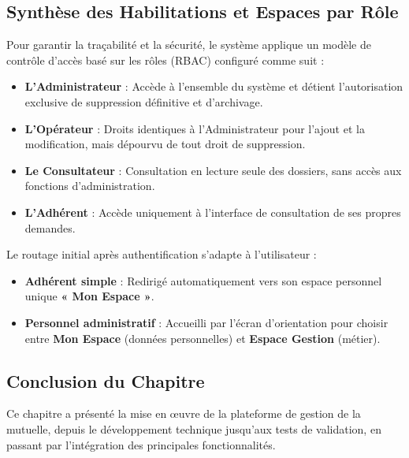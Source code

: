 \subsection{Synthèse des Habilitations et Espaces par Rôle}
\label{subsec:rbac_synthese}
Pour garantir la traçabilité et la sécurité, le système applique un modèle de contrôle d'accès basé sur les rôles (RBAC) configuré comme suit :
\begin{itemize}
    \item \textbf{L'Administrateur} : Accède à l'ensemble du système et détient l'autorisation exclusive de suppression définitive et d'archivage.
    \item \textbf{L'Opérateur} : Droits identiques à l'Administrateur pour l'ajout et la modification, mais dépourvu de tout droit de suppression.
    \item \textbf{Le Consultateur} : Consultation en lecture seule des dossiers, sans accès aux fonctions d'administration.
    \item \textbf{L'Adhérent} : Accède uniquement à l'interface de consultation de ses propres demandes.
\end{itemize}

Le routage initial après authentification s'adapte à l'utilisateur :
\begin{itemize}
    \item \textbf{Adhérent simple} : Redirigé automatiquement vers son espace personnel unique \textbf{« Mon Espace »}.
    \item \textbf{Personnel administratif} : Accueilli par l'écran d'orientation pour choisir entre \textbf{Mon Espace} (données personnelles) et \textbf{Espace Gestion} (métier).
\end{itemize}

\subsection*{Conclusion du Chapitre}

Ce chapitre a présenté la mise en œuvre de la plateforme de gestion de la mutuelle, depuis le développement technique jusqu’aux tests de validation, en passant par l’intégration des principales fonctionnalités.